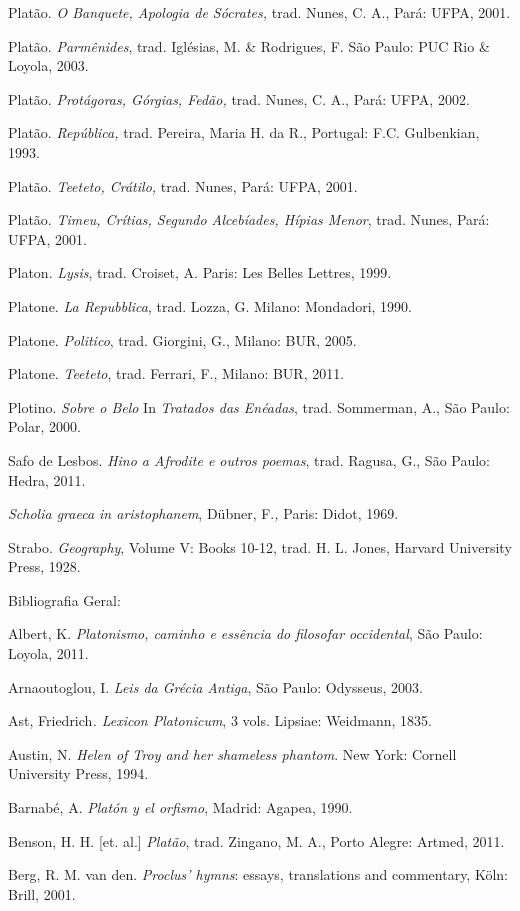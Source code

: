 Platão. \emph{O Banquete, Apologia de Sócrates,} trad. Nunes, C. A.,
Pará: UFPA, 2001.

Platão. \emph{Parmênides}, trad. Iglésias, M. \& Rodrigues, F. São
Paulo: PUC Rio \& Loyola, 2003.

Platão. \emph{Protágoras, Górgias, Fedão,} trad. Nunes, C. A., Pará:
UFPA, 2002.

Platão. \emph{República,} trad. Pereira, Maria H. da R., Portugal: F.C.
Gulbenkian, 1993.

Platão. \emph{Teeteto, Crátilo,} trad. Nunes, Pará: UFPA, 2001.

Platão. \emph{Timeu, Crítias, Segundo Alcebíades, Hípias Menor}, trad.
Nunes, Pará: UFPA, 2001.

Platon. \emph{Lysis}, trad. Croiset, A. Paris: Les Belles Lettres, 1999.

Platone. \emph{La Repubblica}, trad. Lozza, G. Milano: Mondadori, 1990.

Platone. \emph{Politico}, trad. Giorgini, G., Milano: BUR, 2005.

Platone. \emph{Teeteto}, trad. Ferrari, F., Milano: BUR, 2011.

Plotino. \emph{Sobre o Belo} In \emph{Tratados das Enéadas}, trad.
Sommerman, A., São Paulo: Polar, 2000.

Safo de Lesbos. \emph{Hino a Afrodite e outros poemas}, trad. Ragusa,
G., São Paulo: Hedra, 2011.

\emph{Scholia graeca in aristophanem}, Dübner, F.\emph{,} Paris: Didot,
1969.

Strabo. \emph{Geography}, Volume V: Books 10-12, trad. H. L. Jones,
Harvard University Press, 1928.

Bibliografia Geral:

Albert, K. \emph{Platonismo, caminho e essência do filosofar
occidental}, São Paulo: Loyola, 2011.

Arnaoutoglou, I. \emph{Leis da Grécia Antiga}, São Paulo: Odysseus,
2003.

Ast, Friedrich\emph{. Lexicon Platonicum}, 3 vols. Lipsiae: Weidmann,
1835.

Austin, N. \emph{Helen of Troy and her shameless phantom}. New York:
Cornell University Press, 1994.

Barnabé, A. \emph{Platón y el orfismo}, Madrid: Agapea, 1990.

Benson, H. H. {[}et. al.{]} \emph{Platão}, trad. Zingano, M. A., Porto
Alegre: Artmed, 2011.

Berg, R. M. van den. \emph{Proclus' hymns}: essays, translations and
commentary, Köln: Brill, 2001.

